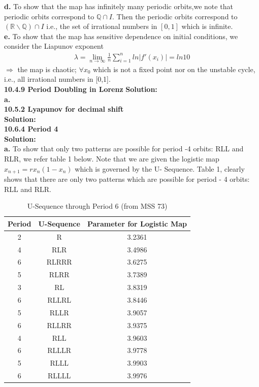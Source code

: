 \documentclass[12pt]{article}
\begin{document}
{\bf d. } To show that the map has infinitely many periodic orbits,we note that periodic orbits correspond to $\mathbb{Q}\cap I.$ Then the periodic orbits correspond to $(\mathbb{R} \backslash \mathbb{Q})\cap I$ i.e., the set of irrational numbers in $[0,1]$ which is infinite. \\
{\bf e. } To show that the map has sensitive dependence on initial conditions, we consider the Liapunov exponent
\begin{align*}
\lambda=\lim_{n\to\infty} \frac{1}{n} \sum_{i=1}^n ln |f'(x_i)|=ln 10 
\end{align*}
$\Rightarrow$ the map is chaotic; $\forall x_0$ which is not a fixed point nor on the unstable cycle, i.e., all irrational numbers in [0,1].\\
\noindent
{\bf 10.4.9 Period Doubling in Lorenz} 
{\bf Solution:}\\
\indent
{\bf a. } \\

\noindent
{\bf 10.5.2 Lyapunov for decimal shift } \\
{\bf Solution: }\\

\bigskip\noindent
{\bf 10.6.4 Period 4}\\
{\bf Solution:}\\
{\bf a. } To show that only two patterns are possible for period -4 orbits: RLL and RLR, we refer table 1 below. Note that we are given the logistic map $x_{n+1}=rx_n(1-x_n)$ which is governed by the U- Sequence. Table 1, clearly shows that there are only two patterns which are possible for period - 4 orbits: RLL and RLR.
\begin{table}[h!]
  \centering
  \caption{U-Sequence through Period 6 (from MSS 73)}
  \label{tab:table1}
  \begin{tabular}{ccc}
    \toprule
    Period & U-Sequence & Parameter for Logistic Map\\
    \midrule
    2 & R & 3.2361\\
    4 & RLR & 3.4986\\
    6 & RLRRR & 3.6275\\
    5 & RLRR & 3.7389\\
    3 & RL & 3.8319\\
    6 & RLLRL & 3.8446\\
    5 & RLLR & 3.9057\\
    6 & RLLRR & 3.9375\\
    4 & RLL & 3.9603\\
    6 & RLLLR & 3.9778\\
    5 & RLLL & 3.9903\\
    6 & RLLLL & 3.9976\\
    \bottomrule
  \end{tabular}
\end{table}
\end{document}
